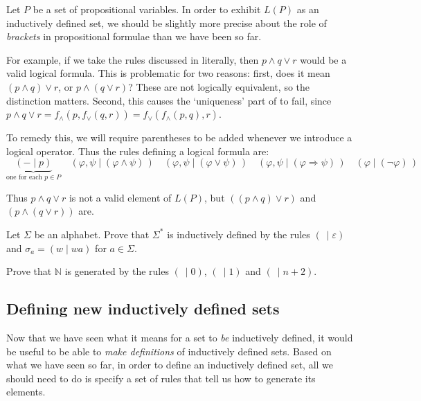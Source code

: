 \begin{example}
\label{exInductivelyDefinedSetOfPropositionalFormulae}
Let $P$ be a set of propositional variables. In order to exhibit $L(P)$ as an inductively defined set, we should be slightly more precise about the role of \textit{brackets} in propositional formulae than we have been so far.

For example, if we take the rules discussed in  literally, then $p \wedge q \vee r$ would be a valid logical formula. This is problematic for two reasons: first, does it mean $(p \wedge q) \vee r$, or $p \wedge (q \vee r)$? These are not logically equivalent, so the distinction matters. Second, this causes the `uniqueness' part of  to fail, since $p \wedge q \vee r = f_{\wedge}(p,f_{\vee}(q,r)) = f_{\vee}(f_{\wedge}(p,q),r)$.

To remedy this, we will require parentheses to be added whenever we introduce a logical operator. Thus the rules defining a logical formula are:
\[ \underbrace{({-} \mid p)}_{\text{one for each } p \in P} \quad (\varphi,\psi \mid (\varphi \wedge \psi)\,) \quad (\varphi,\psi \mid (\varphi \vee \psi)\,) \quad (\varphi,\psi \mid (\varphi \Rightarrow \psi)\,) \quad (\varphi \mid (\neg \varphi)\,) \]

Thus $p \wedge q \vee r$ is not a valid element of $L(P)$, but $((p \wedge q) \vee r)$ and $(p \wedge (q \vee r))$ are.
\end{example}

\begin{exercise}
Let $\Sigma$ be an alphabet. Prove that $\Sigma^*$ is inductively defined by the rules $(~ \mid \varepsilon)$ and $\sigma_a = (w \mid wa)$ for $a \in \Sigma$.
\end{exercise}

\begin{exercise}
Prove that $\mathbb{N}$ is generated by the rules $(~ \mid 0)$, $(~ \mid 1)$ and $(~ \mid n+2)$.
\end{exercise}

\subsection*{Defining new inductively defined sets}

Now that we have seen what it means for a set to \textit{be} inductively defined, it would be useful to be able to \textit{make definitions} of inductively defined sets. Based on what we have seen so far, in order to define an inductively defined set, all we should need to do is specify a set of rules that tell us how to generate its elements.

